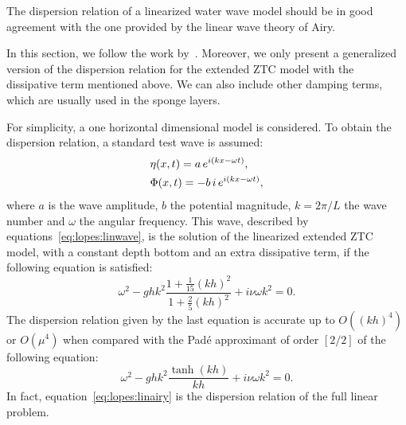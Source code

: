 The dispersion relation  of a
linearized water wave model should be in good agreement with
the one provided by the linear wave theory of Airy.

In this section, we follow the work by~\citet{DutykhDias2007}.
Moreover, we only present a generalized version of the
dispersion relation for the extended ZTC model with the
dissipative term mentioned above.  We can also include other
damping terms, which are usually used in the sponge layers.

For simplicity, a one horizontal dimensional model is considered.  To
obtain the dispersion relation, a standard test wave is
assumed:
\begin{subequations}\label{eq:lopes:linwave}
\begin{align}
&\eta(x,t)=a\,e^{i(kx-\omega
  t)},\vspace{0.3cm}\\
&\Phi(x,t)=-b\,i\,e^{i(kx-\omega t)},
\end{align}
\end{subequations}
where $a$ is the wave amplitude, $b$ the potential
magnitude, $k=2\pi/L$ the wave number and $\omega$ the
angular frequency.  This wave, described by
equations~\eqref{eq:lopes:linwave}, is the solution of the
linearized extended ZTC model, with a constant depth bottom and an
extra dissipative term, if the following equation is
satisfied:
\begin{equation}\label{eq:lopes:dissdisp}
\omega^2-ghk^2\frac{1+\frac{1}{15}(kh)^2}{1+\frac{2}{5}(kh)^2}+i\nu\omega
k^2=0.
\end{equation}
The dispersion relation given by the last equation is
accurate up to $O((kh)^4)$ or $O(\mu^4)$ when compared with
the Pad\'{e} approximant of order $[2/2]$ of the following
equation:
\begin{equation}\label{eq:lopes:linairy}
\omega^2-ghk^2\frac{\tanh(kh)}{kh}+i\nu\omega k^2=0.
\end{equation}
In fact, equation~\eqref{eq:lopes:linairy} is the dispersion
relation of the full linear problem.


